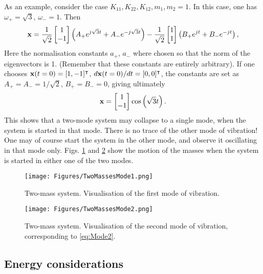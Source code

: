 As an example, consider the case $K_{11},K_{22},K_{12},m_1,m_2=1$. In this case, one has $\omega_+ = \sqrt{3}$, $\omega_- = 1$. Then
\begin{equation}\label{eq:TwoMassesDecomposed}
{\bf x} = \frac{1}{\sqrt{2}}\begin{bmatrix} 1 \\ -1\end{bmatrix}\left(A_+ e^{j\sqrt{3} t} + A_- e^{- j\sqrt{3} t} \right) - \frac{1}{\sqrt{2}}\begin{bmatrix} 1 \\ 1\end{bmatrix}\left(B_+ e^{j  t} + B_- e^{- j t} \right),
\end{equation}
Here the normalisation constants $a_+$, $a_-$ where chosen so that the norm of the eigenvectors is 1. (Remember that these constants are entirely arbitrary). 
If one chooses ${\bf x}(t=0)=[1,-1]^\intercal$, $d{\bf x}(t=0)/dt=[0,0]^\intercal$, the constants are set as $A_+=A_-=1/\sqrt{2}$, $B_+ = B_- = 0$, giving ultimately
\begin{equation}\label{eq:Mode2}
{\bf x} = \begin{bmatrix} 1 \\ -1\end{bmatrix}\cos\left(\sqrt{3}t\right).
\end{equation}
This shows that a two-mode system may collapse to a single mode, when the system is started in that mode. There is no trace of the other mode of vibration! One may of course start the system in the other mode, and observe it oscillating in that mode only. Figs. \ref{fig:TwoMassesMode1} and \ref{fig:TwoMassesMode2} show the motion of the masses when the system is started in either one of the two modes. 
\begin{figure}[hbt]
\centering
\texttt{[image: Figures/TwoMassesMode1.png]}
\caption{Two-mass system. Visualisation of the first mode of vibration.}\label{fig:TwoMassesMode1}
\end{figure}
\begin{figure}[hbt]
\centering
\texttt{[image: Figures/TwoMassesMode2.png]}
\caption{Two-mass system. Visualisation of the second mode of vibration, corresponding to \eqref{eq:Mode2}.}\label{fig:TwoMassesMode2}
\end{figure}



\subsection{Energy considerations}

